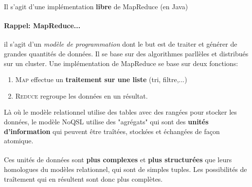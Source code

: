 \item{}
{\faux}
{Il s'agit d'une implémentation \textbf{libre} de MapReduce (en Java) 
\paragraph{Rappel: MapReduce...} il s'agit d'un \textit{modèle de programmation} dont le but est de traiter et générer de grandes quantités de données. Il se base sur des algorithmes parllèles et distribués sur un cluster. Une implémentation de MapReduce se base sur deux fonctions:
\begin{enumerate}
\item \textsc{Map} effectue un \textbf{traitement sur une liste} (tri, filtre,...)
\item \textsc{Reduce} regroupe les données en un résultat.
\end{enumerate}
}


\item{}
{}
{}


\item{}
{}
{}


\item{}
{\vrai}
{Là où le modèle relationnel utilise des tables avec des rangées pour stocker les données, le modèle NoQSL utilise des "agrégats" qui sont des \textbf{unités d'information} qui peuvent être traîtées, stockées et échangées de façon atomique.
\paragraph{}
Ces unités de données sont \textbf{plus complexes} et \textbf{plus structurées} que leurs homologues du modèles relationnel, qui sont de simples tuples. Les possibilités de traîtement qui en résultent sont donc plus complètes.}


